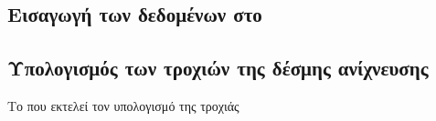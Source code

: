 




\subsection{Εισαγωγή των δεδομένων στο }


\subsection{Υπολογισμός των τροχιών της δέσμης ανίχνευσης}







Το  που εκτελεί τον υπολογισμό της τροχιάς

